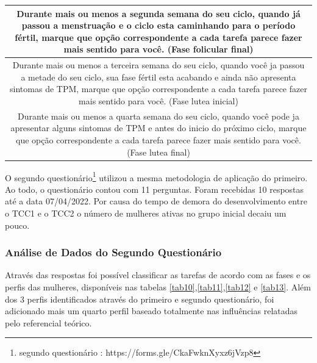 \begin{table}[ht]
\begin{tabular}{c}
        \midrule
        \begin{minipage} [t] {1\textwidth} Durante mais ou menos a segunda semana do seu ciclo, quando já passou a menstruação e o ciclo esta caminhando para o período fértil, marque que opção correspondente a cada tarefa parece fazer mais sentido para você. (Fase folicular final)\end{minipage}\\
        \midrule
        \begin{minipage} [t] {1\textwidth} Durante mais ou menos a terceira semana do seu ciclo, quando você ja passou a metade do seu ciclo, sua fase fértil esta acabando e ainda não apresenta sintomas de TPM, marque que opção correspondente a cada tarefa parece fazer mais sentido para você. (Fase lutea inicial) \end{minipage}\\
        \midrule
        \begin{minipage} [t] {1\textwidth} Durante mais ou menos a quarta semana do seu ciclo, quando você pode ja apresentar alguns sintomas de TPM e antes do inicio do próximo ciclo, marque que opção correspondente a cada tarefa parece fazer mais sentido para você. (Fase lutea final) \end{minipage}\\
        \bottomrule
    \end{tabular}
\end{table}


O segundo questionário\footnote{segundo questionário : https://forms.gle/CkaFwknXyxz6jVzp8} 
utilizou a mesma metodologia de aplicação do primeiro.
Ao todo, o questionário contou com 11 perguntas. Foram recebidas 10 respostas até a 
data 07/04/2022. Por causa do tempo de demora do desenvolvimento 
entre o TCC1 e o TCC2 o número de mulheres ativas no grupo inicial decaiu um pouco. 


\subsubsection{Análise de Dados do Segundo Questionário}

Através das respostas foi possível 
classificar as tarefas de acordo com as fases e os perfis das mulheres, disponíveis nas tabelas \ref{tab10},\ref{tab11},\ref{tab12} e \ref{tab13}.
Além dos 3 perfis identificados através do primeiro e segundo questionário, foi adicionado mais um quarto perfil 
baseado totalmente nas influências relatadas pelo referencial teórico. 

